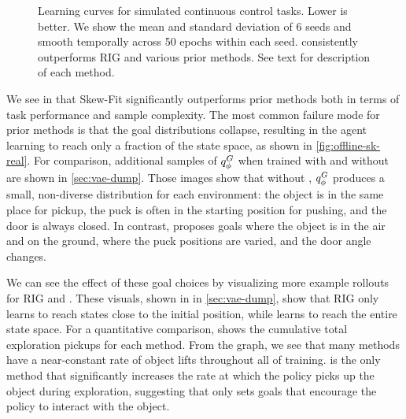 \begin{figure}[ht!]
{\begin{subfigure}[t]{.48\linewidth}
{    }
  \end{subfigure}}
    \caption{
        Learning curves for simulated continuous control tasks.
        Lower is better.
        We show the mean and standard deviation of 6 seeds and smooth temporally across 50 epochs within each seed.
        \METHOD consistently outperforms RIG and various prior methods.
        See text for description of each method.
    }
    \label{fig:sim-results}
\end{figure}
\FloatBarrier
\vspace{.5cm}
We see in  that Skew-Fit significantly outperforms prior methods both in terms of task performance and sample complexity.
The most common failure mode for prior methods is that the goal distributions collapse, resulting in the agent learning to reach only a fraction of the state space, as shown in \autoref{fig:offline-sk-real}.
For comparison, additional samples of ${q^G_{{\phi}}}$ when trained with and without \METHOD are shown in \autoref{sec:vae-dump}.
Those images show that without \METHOD, ${q^G_{{\phi}}}$ produces a small, non-diverse distribution for each environment: the object is in the same place for pickup, the puck is often in the starting position for pushing, and the door is always closed.
In contrast, \METHOD proposes goals where the object is in the air and on the ground, where the puck positions are varied, and the door angle changes.

We can see the effect of these goal choices by visualizing more example rollouts for RIG and \METHOD.
These visuals, shown in  in \autoref{sec:vae-dump}, show that RIG only learns to reach states close to the initial position, while \METHOD learns to reach the entire state space.
For a quantitative comparison,  shows the cumulative total exploration pickups for each method.
From the graph, we see that many methods have a near-constant rate of object lifts throughout all of training.
\METHOD is the only method that significantly increases the rate at which the policy picks up the object during exploration, suggesting that only \METHOD sets goals that encourage the policy to interact with the object.

